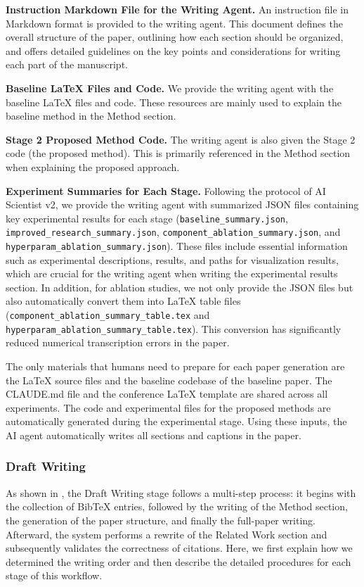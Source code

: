 \textbf{Instruction Markdown File for the Writing Agent.}  
An instruction file in Markdown format is provided to the writing agent.  
This document defines the overall structure of the paper, outlining how each section should be organized, and offers detailed guidelines on the key points and considerations for writing each part of the manuscript.

\textbf{Baseline LaTeX Files and Code.}  
We provide the writing agent with the baseline LaTeX files and code.  
These resources are mainly used to explain the baseline method in the Method section.

\textbf{Stage 2 Proposed Method Code.}  
The writing agent is also given the Stage 2 code (the proposed method).  
This is primarily referenced in the Method section when explaining the proposed approach.


\textbf{Experiment Summaries for Each Stage.}  
Following the protocol of AI Scientist v2, we provide the writing agent with summarized JSON files containing key experimental results for each stage (\texttt{baseline\_summary.json}, \texttt{improved\_research\_summary.json}, \texttt{component\_ablation\_summary.json}, and \texttt{hyperparam\_ablation\_summary.json}).
These files include essential information such as experimental descriptions, results, and paths for visualization results, which are crucial for the writing agent when writing the experimental results section.  
In addition, for ablation studies, we not only provide the JSON files but also automatically convert them into LaTeX table files (\texttt{component\_ablation\_summary\_table.tex} and \texttt{hyperparam\_ablation\_summary\_table.tex}).  
This conversion has significantly reduced numerical transcription errors in the paper.


The only materials that humans need to prepare for each paper generation are the LaTeX source files and the baseline codebase of the baseline paper. The CLAUDE.md file and the conference LaTeX template are shared across all experiments. The code and experimental files for the proposed methods are automatically generated during the experimental stage. Using these inputs, the AI agent automatically writes all sections and captions in the paper.

\subsubsection{Draft Writing}
As shown in , the Draft Writing stage follows a multi-step process:
it begins with the collection of BibTeX entries, followed by the writing of the Method section, the generation of the paper structure, and finally the full-paper writing.
Afterward, the system performs a rewrite of the Related Work section and subsequently validates the correctness of citations.
Here, we first explain how we determined the writing order and then describe the detailed procedures for each stage of this workflow.

